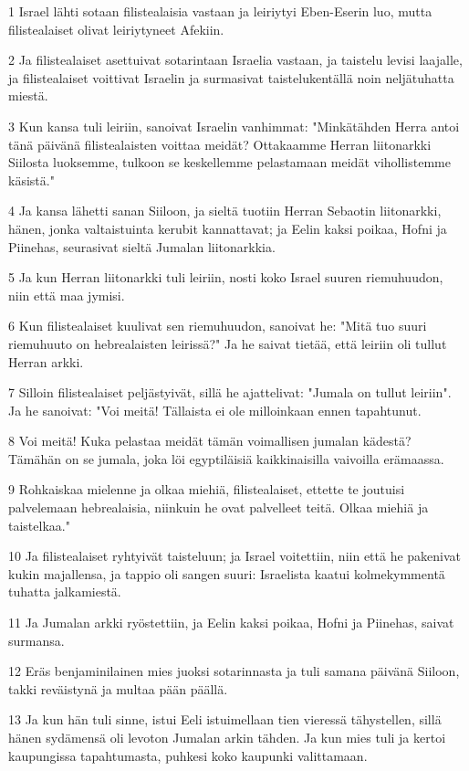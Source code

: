 \par 1 Israel lähti sotaan filistealaisia vastaan ja leiriytyi Eben-Eserin luo, mutta filistealaiset olivat leiriytyneet Afekiin.
\par 2 Ja filistealaiset asettuivat sotarintaan Israelia vastaan, ja taistelu levisi laajalle, ja filistealaiset voittivat Israelin ja surmasivat taistelukentällä noin neljätuhatta miestä.
\par 3 Kun kansa tuli leiriin, sanoivat Israelin vanhimmat: "Minkätähden Herra antoi tänä päivänä filistealaisten voittaa meidät? Ottakaamme Herran liitonarkki Siilosta luoksemme, tulkoon se keskellemme pelastamaan meidät vihollistemme käsistä."
\par 4 Ja kansa lähetti sanan Siiloon, ja sieltä tuotiin Herran Sebaotin liitonarkki, hänen, jonka valtaistuinta kerubit kannattavat; ja Eelin kaksi poikaa, Hofni ja Piinehas, seurasivat sieltä Jumalan liitonarkkia.
\par 5 Ja kun Herran liitonarkki tuli leiriin, nosti koko Israel suuren riemuhuudon, niin että maa jymisi.
\par 6 Kun filistealaiset kuulivat sen riemuhuudon, sanoivat he: "Mitä tuo suuri riemuhuuto on hebrealaisten leirissä?" Ja he saivat tietää, että leiriin oli tullut Herran arkki.
\par 7 Silloin filistealaiset peljästyivät, sillä he ajattelivat: "Jumala on tullut leiriin". Ja he sanoivat: "Voi meitä! Tällaista ei ole milloinkaan ennen tapahtunut.
\par 8 Voi meitä! Kuka pelastaa meidät tämän voimallisen jumalan kädestä? Tämähän on se jumala, joka löi egyptiläisiä kaikkinaisilla vaivoilla erämaassa.
\par 9 Rohkaiskaa mielenne ja olkaa miehiä, filistealaiset, ettette te joutuisi palvelemaan hebrealaisia, niinkuin he ovat palvelleet teitä. Olkaa miehiä ja taistelkaa."
\par 10 Ja filistealaiset ryhtyivät taisteluun; ja Israel voitettiin, niin että he pakenivat kukin majallensa, ja tappio oli sangen suuri: Israelista kaatui kolmekymmentä tuhatta jalkamiestä.
\par 11 Ja Jumalan arkki ryöstettiin, ja Eelin kaksi poikaa, Hofni ja Piinehas, saivat surmansa.
\par 12 Eräs benjaminilainen mies juoksi sotarinnasta ja tuli samana päivänä Siiloon, takki reväistynä ja multaa pään päällä.
\par 13 Ja kun hän tuli sinne, istui Eeli istuimellaan tien vieressä tähystellen, sillä hänen sydämensä oli levoton Jumalan arkin tähden. Ja kun mies tuli ja kertoi kaupungissa tapahtumasta, puhkesi koko kaupunki valittamaan.
